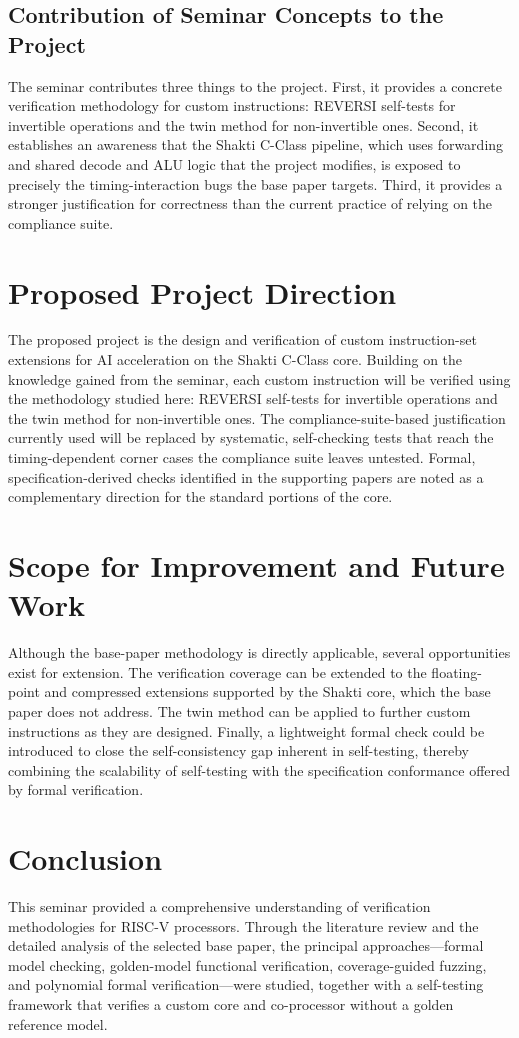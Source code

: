 \documentclass[12pt,a4paper]{report}
\begin{document}
\subsection{Contribution of Seminar Concepts to the Project}
The seminar contributes three things to the project. First, it provides a concrete
verification methodology for custom instructions: REVERSI self-tests for invertible
operations and the twin method for non-invertible ones. Second, it establishes an awareness
that the Shakti C-Class pipeline, which uses forwarding and shared decode and ALU logic that
the project modifies, is exposed to precisely the timing-interaction bugs the base paper
targets. Third, it provides a stronger justification for correctness than the current
practice of relying on the compliance suite.

\section{Proposed Project Direction}
The proposed project is the design and verification of custom instruction-set extensions for
AI acceleration on the Shakti C-Class core. Building on the knowledge gained from the
seminar, each custom instruction will be verified using the methodology studied here:
REVERSI self-tests for invertible operations and the twin method for non-invertible ones.
The compliance-suite-based justification currently used will be replaced by systematic,
self-checking tests that reach the timing-dependent corner cases the compliance suite leaves
untested. Formal, specification-derived checks identified in the supporting papers are noted
as a complementary direction for the standard portions of the core.

\section{Scope for Improvement and Future Work}
Although the base-paper methodology is directly applicable, several opportunities exist for
extension. The verification coverage can be extended to the floating-point and compressed
extensions supported by the Shakti core, which the base paper does not address. The twin
method can be applied to further custom instructions as they are designed. Finally, a
lightweight formal check could be introduced to close the self-consistency gap inherent in
self-testing, thereby combining the scalability of self-testing with the specification
conformance offered by formal verification.

\section{Conclusion}
This seminar provided a comprehensive understanding of verification methodologies for
RISC-V processors. Through the literature review and the detailed analysis of the selected
base paper, the principal approaches---formal model checking, golden-model functional
verification, coverage-guided fuzzing, and polynomial formal verification---were studied,
together with a self-testing framework that verifies a custom core and co-processor without
a golden reference model.
\end{document}
